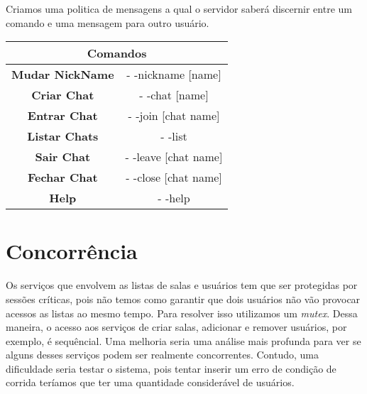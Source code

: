 \documentclass[a4paper, 11pt]{article} %
\begin{document}
Criamos uma politica de mensagens a qual o servidor saberá discernir entre um comando e uma mensagem para outro usuário. 

\begin{center}
\begin{tabular}{|c | c|}
\hline
\multicolumn{2}{|c}{\textbf{Comandos}}\\   
\hline
\textbf{Mudar NickName} & - -nickname [name]  \\
\textbf{Criar Chat} & - -chat [name] \\
\textbf{Entrar Chat} & - -join [chat name] \\
\textbf{Listar Chats} & - -list \\
\textbf{Sair Chat} & - -leave [chat name] \\
\textbf{Fechar Chat} & - -close [chat name] \\
\textbf{Help} & - -help \\
\hline
\end{tabular}
\end{center}


\pagebreak

\section*{Concorrência}


Os serviços que envolvem as listas de salas e usuários tem que ser protegidas por sessões críticas, pois não temos como garantir que dois usuários não vão provocar acessos as listas ao mesmo tempo. Para resolver isso utilizamos um \textit{mutex}. Dessa maneira, o acesso aos serviços de criar salas, adicionar e remover usuários, por exemplo, é sequêncial. Uma melhoria seria uma análise mais profunda para ver se alguns desses serviços podem ser realmente concorrentes. Contudo, uma dificuldade seria testar o sistema, pois tentar inserir um erro de condição de corrida teríamos que ter uma quantidade considerável de usuários.
\end{document}
